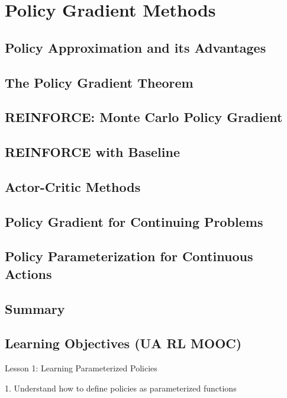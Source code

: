 \documentclass[sutton_barto_notes.tex]{subfiles}
\begin{document}
\newpage
\section{Policy Gradient Methods}



\subsection{Policy Approximation and its Advantages}

\subsection{The Policy Gradient Theorem}

\subsection{REINFORCE: Monte Carlo Policy Gradient}

\subsection{REINFORCE with Baseline}

\subsection{Actor-Critic Methods}

\subsection{Policy Gradient for Continuing Problems}

\subsection{Policy Parameterization for Continuous Actions}

\subsection{Summary}

\subsection{Learning Objectives (UA RL MOOC)}

Lesson 1: Learning Parameterized Policies 

1. Understand how to define policies as parameterized functions 
\end{document}
